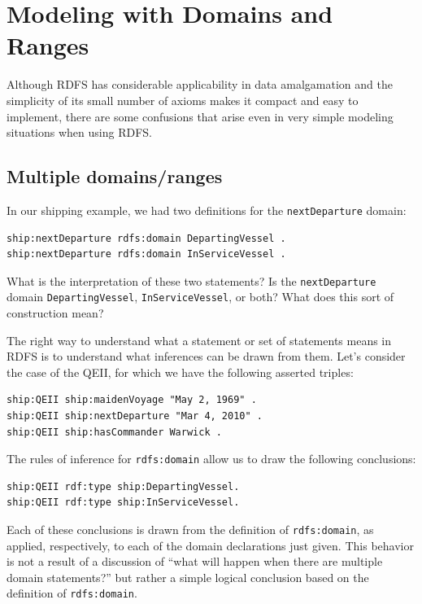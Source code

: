 \section{Modeling with Domains and Ranges}

Although RDFS has considerable applicability in data amalgamation and
the simplicity of its small number of axioms makes it compact and easy
to implement, there are some confusions that arise even in very simple
modeling situations when using RDFS.

\subsection{Multiple domains/ranges}
\label{multidomain}
In our shipping example, we had two definitions for the \texttt{nextDeparture}
domain:

\begin{lstlisting}
ship:nextDeparture rdfs:domain DepartingVessel .
ship:nextDeparture rdfs:domain InServiceVessel .
\end{lstlisting}

What is the interpretation of these two statements? Is the \texttt{nextDeparture}
domain \texttt{DepartingVessel}, \texttt{InServiceVessel}, or both? What does this sort of
construction mean?

The right way to understand what a statement or set of statements means
in RDFS is to understand what inferences can be drawn from them. Let's
consider the case of the QEII, for which we have the following asserted
triples:

\begin{lstlisting}
ship:QEII ship:maidenVoyage "May 2, 1969" .
ship:QEII ship:nextDeparture "Mar 4, 2010" .
ship:QEII ship:hasCommander Warwick .
\end{lstlisting}

The rules of inference for \texttt{rdfs:domain} allow us to draw the following
conclusions:

\begin{lstlisting}
ship:QEII rdf:type ship:DepartingVessel.
ship:QEII rdf:type ship:InServiceVessel.
\end{lstlisting}

Each of these conclusions is drawn from the definition of \texttt{rdfs:domain},
as applied, respectively, to each of the domain declarations just given.
This behavior is not a result of a discussion of ``what will happen when
there are multiple domain statements?'' but rather a simple logical
conclusion based on the definition of \texttt{rdfs:domain}.

